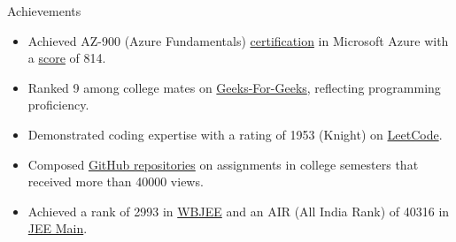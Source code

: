 \documentclass{resume} %
\begin{document}
\begin{rSection}{Achievements} 
\begin{itemize}
\setlength\itemsep{-1.75em} %
     \item Achieved AZ-900 (Azure Fundamentals) \href{https://learn.microsoft.com/en-in/users/arkapratimghosh-4932/credentials/certification-o-/azure-fundamentals}{certification} in Microsoft Azure with a \href{https://drive.google.com/file/d/1s7vbb-FW7VGSNXz2BCDkJnFmuanPQLEC/view}{score} of 814. \\
    \item   Ranked 9 among college mates on \href{https://www.geeksforgeeks.org/user/arkapratimghosh20021/?utm_source=geeksforgeeks&utm_medium=my_profile&utm_campaign=auth_user}{Geeks-For-Geeks}, reflecting programming proficiency. \\
    \item Demonstrated coding expertise with a rating of 1953 (Knight) on \href{https://leetcode.com/21Arka2002/}{LeetCode}. \\
    \item Composed \href{https://github.com/arkapg211002/TotalViewsProjectRepoReadme}{GitHub repositories} on assignments in college semesters that received more than 40000 views. \\
    \item Achieved a rank of 2993 in \href{https://drive.google.com/file/d/1xc6hvBjQhrxccVi4ENYZc62iL98IfvNh/view}{WBJEE} and an AIR (All India Rank) of 40316 in \href{https://drive.google.com/file/d/1xjdXfsoL_L62ij-P8jDuyyKQw9I1_Ht0/view}{JEE Main}.
\end{itemize}

% 

\end{rSection}




\end{document}
